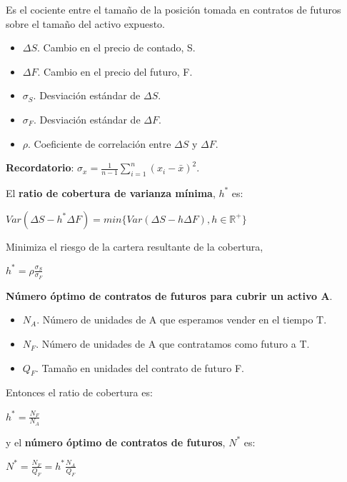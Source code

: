 \documentclass[
10pt, %
a4paper, %
oneside, %
headinclude,footinclude, %
BCOR5mm, %
]{scrartcl}
\newcommand{\n}[1]{\textbf{#1}}
\newcommand{\sub}[1]{_{#1}}
\newcommand{\pot}[1]{^{#1}}
\newcommand{\f}[1]{{\large{${#1}$}}}
\newcommand{\sumatorio}[2]{\sum_{#1}^{#2}}
\newcommand{\rn}[1]{\mathbb{R}\pot{#1}}
\newcounter{ex}
\begin{document}

			Es el cociente entre el tamaño de la posición tomada en contratos de futuros sobre el tamaño del activo expuesto.
			\begin{itemize}
				\item \f{\Delta S}. Cambio en el precio de contado, S.
				\item \f{\Delta F}. Cambio en el precio del futuro, F.
				\item \f{\sigma\sub{S}}. Desviación estándar de \f{\Delta S}. 
				\item \f{\sigma\sub{F}}. Desviación estándar de \f{\Delta F}.
				\item \f{\rho}. Coeficiente de correlación entre \f{\Delta S} y \f{\Delta F}.
			\end{itemize}

			\n{Recordatorio}: \f{\sigma\sub{x} = \frac{1}{n-1} \sumatorio{i=1}{n} (x\sub{i}-\bar{x})\pot{2}}.

			El \n{ratio de cobertura de varianza mínima}, \f{h\pot{*}} es:
			\begin{center} \f{Var(\Delta S - h\pot{*}\Delta F) = min\{Var(\Delta S - h\Delta F), h\in \rn{+}\}} \end{center}

			Minimiza el riesgo de la cartera resultante de la cobertura, 
			\begin{center} \f{h\pot{*} = \rho \frac{\sigma\sub{S}}{\sigma\sub{F}}} \end{center}

			\vspace{0.3cm}
			
			\begin{framed}
			\n{Número óptimo de contratos de futuros para cubrir un activo A}.
			\begin{itemize}
				\item \f{N\sub{A}}. Número de unidades de A que esperamos vender en el tiempo T.
				\item \f{N\sub{F}}. Número de unidades de A que contratamos como futuro a T.
				\item \f{Q\sub{F}}. Tamaño en unidades del contrato de futuro F. 
			\end{itemize}

			Entonces el ratio de cobertura es:
					\begin{center} \f{h\pot{*} = \frac{N\sub{F}}{N\sub{A}}} \end{center}
			y el \n{número óptimo de contratos de futuros}, \f{N\pot{*}} es:
				\begin{center} \f{N\pot{*} = \frac{N\sub{F}}{Q\sub{F}} = h\pot{*}\frac{N\sub{A}}{Q\sub{F}}} \end{center}
			\end{framed}
\end{document}

